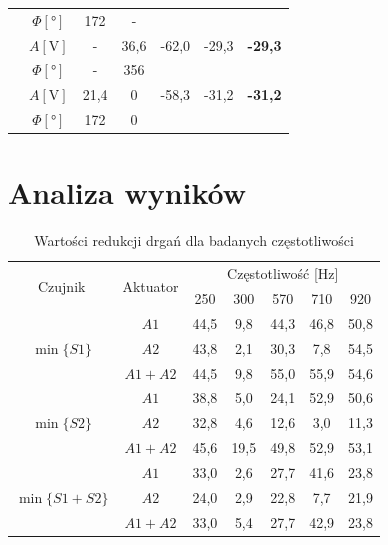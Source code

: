 \documentclass[polish,a4paper,11pt]{mwart}
\let\Oldsection\section
\renewcommand{\section}{\FloatBarrier\Oldsection}
\begin{document}
\begin{table}[!tbh]
\begin{tabular}{|c|c|c|c|c|c|c|}
				       &$\Phi [\si{\degree}]$ & 172 & - & \multicolumn{3}{c}{}\\\cline{2-7}
				       &   $A [\si{\V}]$ & - & 36,6 & -62,0 & -29,3 & \textbf{-29,3} \\\cline{2-7}
				       &$\Phi [\si{\degree}]$ & - & 356 & \multicolumn{3}{c}{}\\\cline{2-7}
				       &   $A [\si{\V}]$ & 21,4 & 0 & -58,3 & -31,2 & \textbf{-31,2} \\\cline{2-7}
				       &$\Phi [\si{\degree}]$ & 172 & 0 & \multicolumn{3}{c}{}\\\cline{1-4}
  \end{tabular}
\end{table}

\section{Analiza wyników}

\begin{table}[!tbh]
  \centering
  \caption{Wartości redukcji drgań dla badanych częstotliwości}
  \begin{tabular}{|c|c|c|c|c|c|c|}
    \hline
    \multirow{2}{*}{Czujnik} & \multirow{2}{*}{Aktuator} & \multicolumn{5}{c|}{Częstotliwość [\si{\hertz}]} \\\cline{3-7}
							&& 250 & 300 & 570 & 710 & 920 \\\hline
    \multirow{3}{*}{$\min\{S1\}$}      & $A1$      & 44,5 & 9,8 & 44,3 & 46,8 & 50,8 \\\cline{2-7}
				       & $A2$      & 43,8 & 2,1 & 30,3 & 7,8 & 54,5 \\\cline{2-7}
				       & $A1 + A2$ & 44,5 & 9,8 & 55,0 & 55,9 & 54,6 \\\hline
    \multirow{3}{*}{$\min\{S2\}$}      & $A1$      & 38,8 & 5,0 & 24,1 & 52,9 & 50,6 \\\cline{2-7}
				       & $A2$      & 32,8 & 4,6 & 12,6 & 3,0 & 11,3 \\\cline{2-7}
				       & $A1 + A2$ & 45,6 & 19,5 & 49,8 & 52,9 & 53,1 \\\hline
    \multirow{3}{*}{$\min\{S1 + S2\}$} & $A1$      & 33,0 & 2,6 & 27,7 & 41,6 & 23,8 \\\cline{2-7}
				       & $A2$      & 24,0 & 2,9 & 22,8 & 7,7 & 21,9 \\\cline{2-7}
				       & $A1 + A2$ & 33,0 & 5,4 & 27,7 & 42,9 & 23,8 \\\hline
  \end{tabular}
  \label{tab:redukcja}
\end{table}
\end{document}
